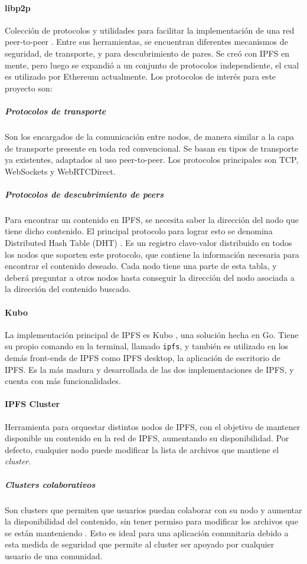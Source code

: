 \paragraph{libp2p} Colección de protocolos y utilidades para facilitar la implementación de una red peer-to-peer \cite{libp2p}. Entre sus herramientas, se encuentran diferentes mecanismos de seguridad, de transporte, y para descubrimiento de pares. Se creó con IPFS en mente, pero luego se expandió a un conjunto de protocolos independiente, el cual es utilizado por Ethereum actualmente. Los protocolos de interés para este proyecto son:
\subparagraph{Protocolos de transporte} Son los encargados de la comunicación entre nodos, de manera similar a la capa de transporte presente en toda red convencional. Se basan en tipos de transporte ya existentes, adaptados al uso peer-to-peer. Los protocolos principales son TCP, WebSockets y WebRTCDirect.
\subparagraph{Protocolos de descubrimiento de peers} Para encontrar un contenido en IPFS, se necesita saber la dirección del nodo que tiene dicho contenido. El principal protocolo para lograr esto se denomina Distributed Hash Table (DHT) \cite{dht} \cite{kadmelia}. Es un registro clave-valor distribuido en todos los nodos que soporten este protocolo, que contiene la información necesaria para encontrar el contenido deseado. Cada nodo tiene una parte de esta tabla, y deberá preguntar a otros nodos hasta conseguir la dirección del nodo asociada a la dirección del contenido buscado.

\paragraph{Kubo} La implementación principal de IPFS es Kubo \cite{kubo}, una solución hecha en Go. Tiene su propio comando en la terminal, llamado \texttt{ipfs}, y también es utilizado en los demás front-ends de IPFS como IPFS desktop, la aplicación de escritorio de IPFS. Es la más madura y desarrollada de las dos implementaciones de IPFS, y cuenta con más funcionalidades.

\paragraph{IPFS Cluster} Herramienta para orquestar distintos nodos de IPFS, con el objetivo de mantener disponible un contenido en la red de IPFS, aumentando su disponibilidad. Por defecto, cualquier nodo puede modificar la lista de archivos que mantiene el \textit{cluster}.
\subparagraph{Clusters colaborativos} Son clusters que permiten que usuarios puedan colaborar con su nodo y aumentar la disponibilidad del contenido, sin tener permiso para modificar los archivos que se están manteniendo \cite{collaborative-clusters}. Esto es ideal para una aplicación comunitaria debido a esta medida de seguridad que permite al cluster ser apoyado por cualquier usuario de una comunidad.

